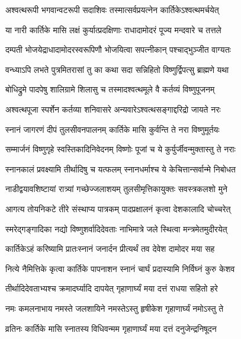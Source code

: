 \twolineshloka
{अश्वत्थरूपी भगवान्वटरूपी सदाशिवः}
{तस्मात्सर्वप्रयत्नेन कार्तिकेऽश्वत्थमर्चयेत्} %

\twolineshloka
{या नारी कार्तिके मासि लक्षं कुर्यात्प्रदक्षिणाः}
{राधादामोदरं पूज्य मन्दवारे च तत्तले} %

\twolineshloka
{दम्पती भोजयेद्राधादामोदरस्वरूपिणौ}
{भोजयित्वा सपत्नीकान् पश्चाद्भुञ्जीत वाग्यतः} %

\twolineshloka
{वन्ध्याऽपि लभते पुत्रमितरासां तु का कथा}
{सदा सन्निहितो विष्णुर्द्विपत्सु ब्राह्मणे यथा} %

\twolineshloka
{बोधिद्रुमे पादपेषु शालिग्रामे शिलासु च}
{तस्मादश्वत्थमूले वै कर्तव्यं विष्णुपूजनम्} %

\twolineshloka
{अश्वत्थपूजा स्पर्शेन कर्तव्या शनिवासरे}
{अन्यवारेऽश्वत्थसङ्गाद्दरिद्रो जायते नरः} %

\twolineshloka
{स्नानं जागरणं दीपं तुलसीवनपालनम्}
{कार्तिके मासि कुर्वन्ति ते नरा विष्णुमूर्तयः} %

\twolineshloka
{सम्मार्जनं विष्णुगृहे स्वस्तिकादिनिवेदनम्}
{विष्णोः पूजां च ये कुर्युर्जीवन्मुक्तास्तु ते नराः} %

\twolineshloka
{स्नानकालं प्रवक्ष्यामि तीर्थादिषु च यत्फलम्}
{स्नानधर्माश्च ये केचित्तान्सर्वान्मे निबोधत} %






\twolineshloka
{नाडीद्वयावशिष्टायां रात्र्यां गच्छेज्जलाशयम्}
{तुलसीमृत्तिकायुक्तः सवस्त्रकलशो मुने} %

\twolineshloka
{आगत्य तोयनिकटे तीरे संस्थाप्य पात्रकम्}
{पादप्रक्षालनं कृत्वा देशकालादि चोच्चरेत्} %

\twolineshloka
{स्मरेद्गङ्गादिका नद्यो विष्णुशर्वादिदेवताः}
{नाभिमात्रे जले स्थित्वा मन्त्रमेतमुदीरयेत्} %

\twolineshloka
{कार्तिकेऽहं करिष्यामि प्रातःस्नानं जनार्दन}
{प्रीत्यर्थं तव देवेश दामोदर मया सह} %

\twolineshloka
{नित्ये नैमित्तिके कृत्वा कार्तिके पापनाशन}
{स्नानं चार्घं प्रदास्यामि निर्विघ्नं कुरु केशव} %

\twolineshloka
{तीर्थादिदेवताभ्यश्च क्रमादर्घ्यादि दापयेत्}
{गृहाणार्घ्यं मया दत्तं राधया सहितो हरे} %

\twolineshloka
{नमः कमलनाभाय नमस्ते जलशायिने}
{नमस्तेऽस्तु हृषीकेश गृहाणार्घ्यं नमोऽस्तु ते} %

\twolineshloka
{व्रतिनः कार्तिके मासि स्नातस्य विधिवन्मम}
{गृहाणार्घ्यं मया दत्तं दनुजेन्द्रनिषूदन} %

